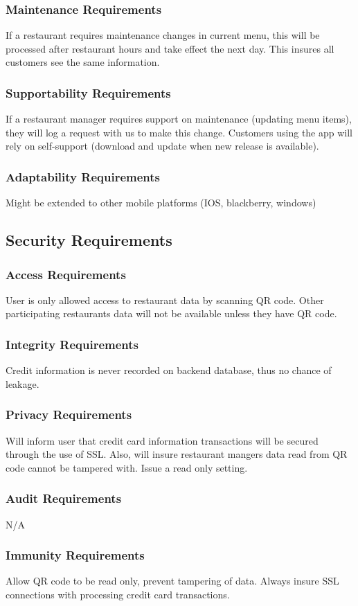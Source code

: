 \documentclass[12pt, titlepage]{article}
\begin{document}
\subsubsection{Maintenance Requirements}
If a restaurant requires maintenance changes in current menu, this will be processed after restaurant hours and take effect the next day. This insures all customers see the same information. 
\subsubsection{Supportability Requirements}
If a restaurant manager requires support on maintenance (updating menu items), they will log a request with us to make this change. Customers using the app will rely on self-support (download and update when new release is available).
\subsubsection{Adaptability Requirements}
Might be extended to other mobile platforms (IOS, blackberry, windows) 
\subsection{Security Requirements}
\subsubsection{Access Requirements}
User is only allowed access to restaurant data by scanning QR code. Other participating restaurants data will not be available unless they have QR code. 
\subsubsection{Integrity Requirements}
Credit information is never recorded on backend database, thus no chance of leakage.
\subsubsection{Privacy Requirements}
Will inform user that credit card information transactions will be secured through the use of SSL. Also, will insure restaurant mangers data read from QR code cannot be tampered with. Issue a read only setting. 
\subsubsection{Audit Requirements}
N/A
\subsubsection{Immunity Requirements}
Allow QR code to be read only, prevent tampering of data. 	Always insure SSL connections with processing credit card transactions.
\end{document}
